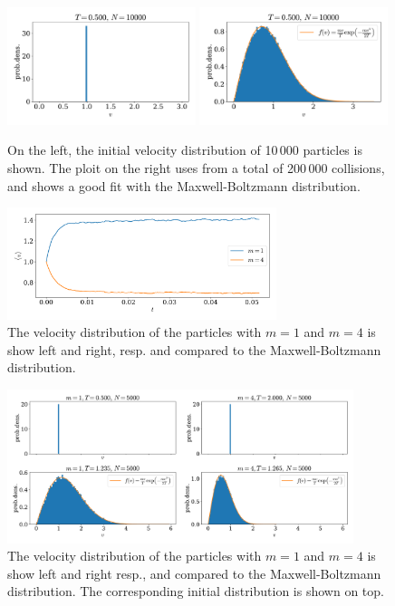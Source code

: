\documentclass{article}
\begin{document}
    \begin{figure}[H]
        \centering
        \includegraphics[width=0.49\textwidth]{../plots/problem1/2/vel_dist.pdf}
        \includegraphics[width=0.49\textwidth]{../plots/problem1/vel_dist.pdf}
        \caption{On the left, the initial velocity distribution of 10\,000 particles is shown. The ploit on the right uses from a total of 200\,000 collisions, and shows a good fit with the Maxwell-Boltzmann distribution.}
        \label{problem1 dist}
    \end{figure}
    \begin{figure}[H]
        \centering
        \includegraphics[width=0.7\textwidth]{../plots/problem2/v_av.pdf}
        \caption{The velocity distribution of the particles with $m=1$ and $m=4$ is show left and right, resp.
        and compared to the Maxwell-Boltzmann distribution.}
        \label{problem2 av vel}
    \end{figure}
    \begin{figure}[H]
        \centering
        \includegraphics[width=0.9\textwidth]{../plots/problem2/vel_dist.pdf}
        \caption{The velocity distribution of the particles with $m=1$ and $m=4$ is show left and right resp.,
        and compared to the Maxwell-Boltzmann distribution. The corresponding initial distribution is shown on top.}
        \label{problem2 dist}
    \end{figure}
 
\end{document}
